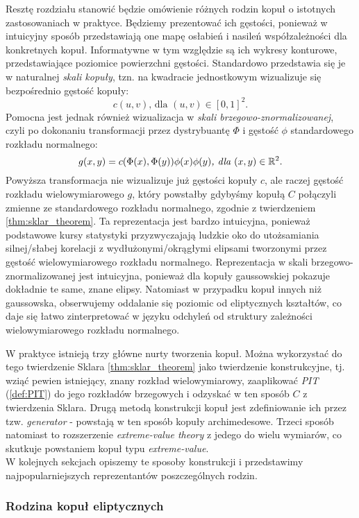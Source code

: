 Resztę rozdziału stanowić będzie omówienie różnych rodzin kopuł o istotnych zastosowaniach w praktyce. Będziemy prezentować ich gęstości, ponieważ w intuicyjny sposób przedstawiają one mapę osłabień i nasileń współzależności dla konkretnych kopuł. Informatywne w tym względzie są ich wykresy konturowe, przedstawiające poziomice powierzchni gęstości. Standardowo przedstawia się je w naturalnej \emph{skali kopuły}, tzn. na kwadracie jednostkowym wizualizuje się bezpośrednio gęstość kopuły:
$$ c(u, v)\text{, dla } (u, v) \in [0, 1]^2.$$
Pomocna jest jednak również wizualizacja w \emph{skali brzegowo-znormalizowanej}, czyli po dokonaniu transformacji przez dystrybuantę $\Phi$ i gęstość $\phi$ standardowego rozkładu normalnego:
 $$ g(x, y) = c(\Phi(x), \Phi(y))\phi(x)\phi(y)\textit{, dla }(x,y)\in\mathbb{R}^2.$$
Powyższa transformacja nie wizualizuje już gęstości kopuły $c$, ale raczej gęstość rozkładu wielowymiarowego $g$, który powstałby gdybyśmy kopułą $C$ połączyli zmienne ze standardowego rozkładu normalnego, zgodnie z twierdzeniem \ref{thm:sklar_theorem}. Ta reprezentacja jest bardzo intuicyjna, ponieważ podstawowe kursy statystyki przyzwyczajają ludzkie oko do utożsamiania silnej/słabej korelacji z wydłużonymi/okrągłymi elipsami tworzonymi przez gęstość wielowymiarowego rozkładu normalnego. Reprezentacja w skali brzegowo-znormalizowanej jest intuicyjna, ponieważ dla kopuły gaussowskiej pokazuje dokładnie te same, znane elipsy. Natomiast w przypadku kopuł innych niż gaussowska, obserwujemy oddalanie się poziomic od eliptycznych kształtów, co daje się łatwo zinterpretować w języku odchyleń od struktury zależności wielowymiarowego rozkładu normalnego.

W praktyce istnieją trzy główne nurty tworzenia kopuł. Można wykorzystać do tego twierdzenie Sklara \ref{thm:sklar_theorem} jako twierdzenie konstrukcyjne, tj. wziąć pewien istniejący, znany rozkład wielowymiarowy, zaaplikować \emph{PIT} (\ref{def:PIT}) do jego rozkładów brzegowych i odzyskać w ten sposób $C$ z twierdzenia Sklara. Drugą metodą konstrukcji kopuł jest zdefiniowanie ich przez tzw. \emph{generator} - powstają w ten sposób kopuły archimedesowe. Trzeci sposób natomiast to rozszerzenie \emph{extreme-value theory} z jedego do wielu wymiarów, co skutkuje powstaniem kopuł typu \emph{extreme-value}.\\
W kolejnych sekcjach opiszemy te sposoby konstrukcji i przedstawimy najpopularniejszych reprezentantów poszczególnych rodzin.

\subsubsection{Rodzina kopuł eliptycznych}

